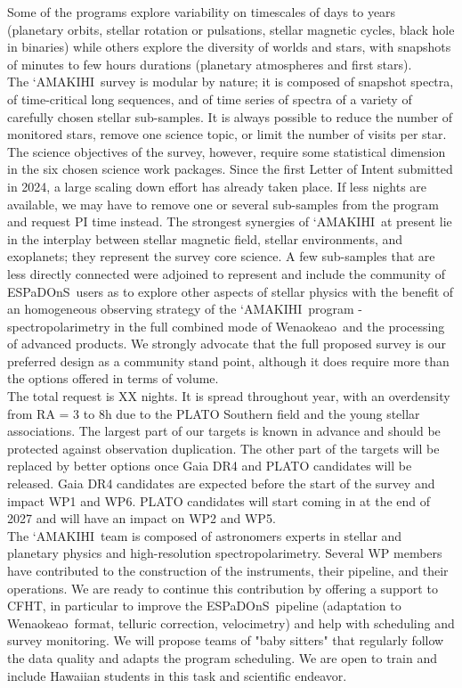 \documentclass[
    traditabstract,
    longauth,
    onecolumn,
]{aa}
\def \amakihi{`AMAKIHI}
\def \esp{ESPaDOnS}
\def \wena{Wenaokeao}
\begin{document}
Some of the programs explore variability on timescales of days to years (planetary orbits, stellar rotation or pulsations, stellar magnetic cycles, black hole in binaries) while others explore the diversity of worlds and stars, with snapshots of minutes to few hours durations (planetary atmospheres and first stars). \\

The \amakihi\ survey is modular by nature; it is composed of snapshot spectra, of time-critical long sequences, and of time series of spectra of a variety of carefully chosen stellar sub-samples. It is always possible to reduce the number of monitored stars, remove one science topic, or limit the number of visits per star. The science objectives of the survey, however, require some statistical dimension in the six chosen science work packages. Since the first Letter of Intent submitted in 2024, a large scaling down effort has already taken place. If less nights are available, we may have to remove one or several sub-samples from the program and request PI time instead. The strongest synergies of \amakihi\ at present lie in the interplay between stellar magnetic field, stellar environments, and exoplanets; they represent the survey core science. A few sub-samples that are less directly connected were adjoined to represent and include the community of \esp\ users as to explore other aspects of stellar physics with the benefit of an homogeneous observing strategy of the \amakihi\ program -spectropolarimetry in the full combined mode of \wena\ and the processing of advanced products. We strongly advocate that the full proposed survey is our preferred design as a community stand point, although it does require more than the options offered in terms of volume. \\

The total request is XX nights. It is spread throughout year, with an overdensity from RA = 3 to 8h due to the PLATO Southern field and the young stellar associations. The largest part of our targets is known in advance and should be protected against observation duplication. The other part of the targets will be replaced by better options once Gaia DR4 and PLATO candidates will be released. Gaia DR4 candidates are expected before the start of the survey and impact WP1 and WP6. PLATO candidates will start coming in at the end of 2027 and will have an impact on WP2 and WP5. \\

The \amakihi\ team is composed of astronomers experts in stellar and planetary physics and high-resolution spectropolarimetry. Several WP members have contributed to the construction of the instruments, their pipeline, and their operations. We are ready to continue this contribution by offering a support to CFHT, in particular to improve the \esp\ pipeline (adaptation to \wena\ format, telluric correction, velocimetry) and help with scheduling and survey monitoring. We will propose teams of "baby sitters" that regularly follow the data quality and adapts the program scheduling. We are open to train and include Hawaiian students in this task and scientific endeavor.\\
\end{document}
